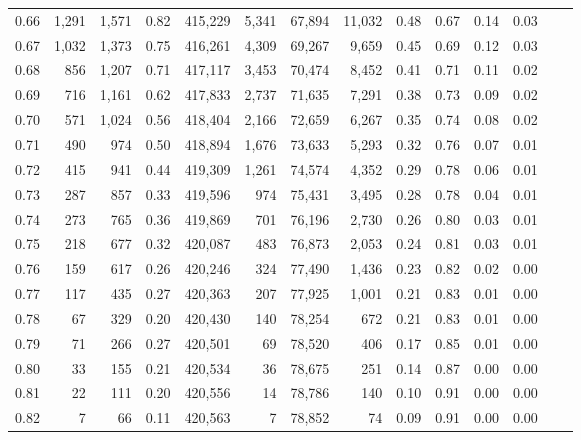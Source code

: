 \begin{tabular}{rrrrrrrrrrrrrr}
0.66 &   1,291 &  1,571 &    0.82 &  415,229 &    5,341 &  67,894 &  11,032 &  0.48 &  0.67 &  0.14 &      0.03 \\
0.67 &   1,032 &  1,373 &    0.75 &  416,261 &    4,309 &  69,267 &   9,659 &  0.45 &  0.69 &  0.12 &      0.03 \\
0.68 &     856 &  1,207 &    0.71 &  417,117 &    3,453 &  70,474 &   8,452 &  0.41 &  0.71 &  0.11 &      0.02 \\
0.69 &     716 &  1,161 &    0.62 &  417,833 &    2,737 &  71,635 &   7,291 &  0.38 &  0.73 &  0.09 &      0.02 \\
0.70 &     571 &  1,024 &    0.56 &  418,404 &    2,166 &  72,659 &   6,267 &  0.35 &  0.74 &  0.08 &      0.02 \\
0.71 &     490 &    974 &    0.50 &  418,894 &    1,676 &  73,633 &   5,293 &  0.32 &  0.76 &  0.07 &      0.01 \\
0.72 &     415 &    941 &    0.44 &  419,309 &    1,261 &  74,574 &   4,352 &  0.29 &  0.78 &  0.06 &      0.01 \\
0.73 &     287 &    857 &    0.33 &  419,596 &      974 &  75,431 &   3,495 &  0.28 &  0.78 &  0.04 &      0.01 \\
0.74 &     273 &    765 &    0.36 &  419,869 &      701 &  76,196 &   2,730 &  0.26 &  0.80 &  0.03 &      0.01 \\
0.75 &     218 &    677 &    0.32 &  420,087 &      483 &  76,873 &   2,053 &  0.24 &  0.81 &  0.03 &      0.01 \\
0.76 &     159 &    617 &    0.26 &  420,246 &      324 &  77,490 &   1,436 &  0.23 &  0.82 &  0.02 &      0.00 \\
0.77 &     117 &    435 &    0.27 &  420,363 &      207 &  77,925 &   1,001 &  0.21 &  0.83 &  0.01 &      0.00 \\
0.78 &      67 &    329 &    0.20 &  420,430 &      140 &  78,254 &     672 &  0.21 &  0.83 &  0.01 &      0.00 \\
0.79 &      71 &    266 &    0.27 &  420,501 &       69 &  78,520 &     406 &  0.17 &  0.85 &  0.01 &      0.00 \\
0.80 &      33 &    155 &    0.21 &  420,534 &       36 &  78,675 &     251 &  0.14 &  0.87 &  0.00 &      0.00 \\
0.81 &      22 &    111 &    0.20 &  420,556 &       14 &  78,786 &     140 &  0.10 &  0.91 &  0.00 &      0.00 \\
0.82 &       7 &     66 &    0.11 &  420,563 &        7 &  78,852 &      74 &  0.09 &  0.91 &  0.00 &      0.00 \\

\end{tabular}
